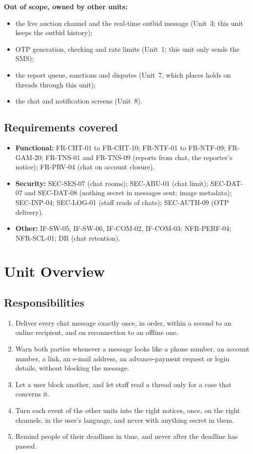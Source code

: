 \documentclass[11pt,a4paper]{article}
\begin{document}
\textbf{Out of scope, owned by other units:}
\begin{itemize}[nosep]
  \item the live auction channel and the real-time outbid message (Unit~3; this unit keeps the outbid history);
  \item OTP generation, checking and rate limits (Unit~1; this unit only sends the SMS);
  \item the report queue, sanctions and disputes (Unit~7, which places holds on threads through this unit);
  \item the chat and notification screens (Unit~8).
\end{itemize}

\subsection{Requirements covered}
\begin{itemize}[nosep]
  \item \textbf{Functional:} FR-CHT-01 to FR-CHT-10; FR-NTF-01 to FR-NTF-09; FR-GAM-20; FR-TNS-01 and FR-TNS-09 (reports from chat, the reporter's notice); FR-PRV-04 (chat on account closure).
  \item \textbf{Security:} SEC-SES-07 (chat rooms); SEC-ABU-01 (chat limit); SEC-DAT-07 and SEC-DAT-08 (nothing secret in messages sent; image metadata); SEC-INP-04; SEC-LOG-01 (staff reads of chats); SEC-AUTH-09 (OTP delivery).
  \item \textbf{Other:} IF-SW-05, IF-SW-06, IF-COM-02, IF-COM-03; NFR-PERF-04; NFR-SCL-01; DR (chat retention).
\end{itemize}

\section{Unit Overview}

\subsection{Responsibilities}
\begin{enumerate}[nosep]
  \item Deliver every chat message exactly once, in order, within a second to an online recipient, and on reconnection to an offline one.
  \item Warn both parties whenever a message looks like a phone number, an account number, a link, an e-mail address, an advance-payment request or login details, without blocking the message.
  \item Let a user block another, and let staff read a thread only for a case that concerns it.
  \item Turn each event of the other units into the right notices, once, on the right channels, in the user's language, and never with anything secret in them.
  \item Remind people of their deadlines in time, and never after the deadline has passed.
\end{enumerate}
\end{document}
